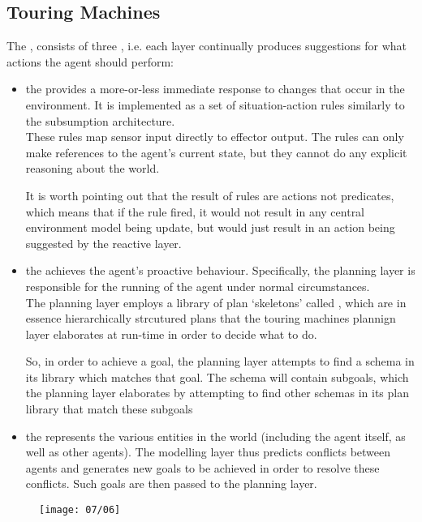 \subsection{Touring Machines}
The , consists of three , i.e. each layer continually produces suggestions for what actions the agent should perform:
\begin{itemize}
\item the  provides a more-or-less immediate response to changes that occur in the environment. It is implemented as a set of situation-action rules similarly to the subsumption architecture.\\
These rules map sensor input directly to effector output. The rules can only make references to the agent's current state, but they cannot do any explicit reasoning about the world.

It is worth pointing out that the result of rules are actions not predicates, which means that if the rule fired, it would not result in any central environment model being update, but would just result in an action being suggested by the reactive layer.
\item the  achieves the agent's proactive behaviour. Specifically, the planning layer is responsible for the running of the agent under normal circumstances.\\
The planning layer employs a library of plan `skeletons' called , which are in essence hierarchically strcutured plans that the touring machines plannign layer elaborates at run-time in order to decide what to do.

So, in order to achieve a goal, the planning layer attempts to find a schema in its library which matches that goal. The schema will contain subgoals, which the planning layer elaborates by attempting to find other schemas in its plan library that match these subgoals
\item the  represents the various entities in the world (including the agent itself, as well as other agents). The modelling layer thus predicts conflicts between agents and generates new goals to be achieved in order to resolve these conflicts. Such goals are then passed to the planning layer.
\end{itemize}

\begin{figure}[!h]
\centering
\texttt{[image: 07/06]}
\end{figure}

